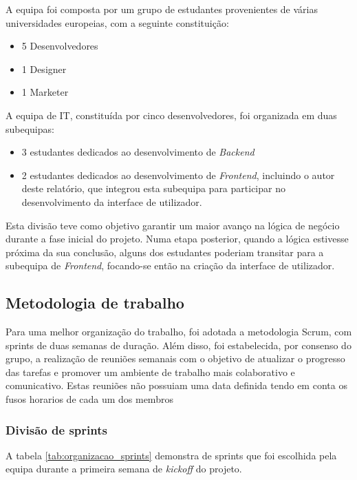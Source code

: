 A equipa foi composta por um grupo de estudantes provenientes de várias universidades europeias, com a seguinte constituição:

\begin{itemize}
    \item 5 Desenvolvedores
    \item 1 Designer
    \item 1 Marketer
\end{itemize}

A equipa de IT, constituída por cinco desenvolvedores, foi organizada em duas subequipas: 
\begin{itemize}
    \item 3 estudantes dedicados ao desenvolvimento de \textit{Backend}
    \item 2 estudantes dedicados ao desenvolvimento de \textit{Frontend}, incluindo o autor deste relatório, que integrou esta subequipa para participar no desenvolvimento da interface de utilizador.
\end{itemize}

Esta divisão teve como objetivo garantir um maior avanço na lógica de negócio durante a fase inicial do projeto. 
Numa etapa posterior, quando a lógica estivesse próxima da sua conclusão, alguns dos estudantes poderiam transitar para a subequipa de \textit{Frontend}, focando-se então na criação da interface de utilizador.

\subsection{Metodologia de trabalho}

Para uma melhor organização do trabalho, foi adotada a metodologia Scrum, com sprints de duas semanas de duração. Além disso, foi estabelecida, por consenso do grupo, a realização de reuniões semanais com o objetivo de atualizar o progresso das tarefas e promover um ambiente de trabalho mais colaborativo e comunicativo. Estas reuniões não possuiam uma data definida tendo em conta os fusos horarios de cada um dos membros

\subsubsection{Divisão de sprints}

A tabela \ref{tab:organizacao_sprints} demonstra de sprints que foi escolhida pela equipa durante a primeira semana de \textit{kickoff} do projeto.



